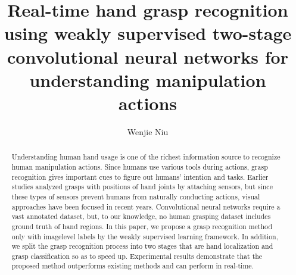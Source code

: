\documentclass[10pt,twocolumn,letterpaper]{article}
\begin{document}
\title{Real-time hand grasp recognition using weakly supervised two-stage convolutional neural networks for understanding manipulation actions}
\author{Wenjie Niu}
\maketitle

\begin{abstract}
   Understanding human hand usage is one of the richest information source to recognize human manipulation actions. Since humans use various tools during actions, grasp recognition gives important cues to figure out humans’ intention and tasks. Earlier studies analyzed grasps with positions of hand joints by attaching sensors, but since these types of sensors prevent humans from naturally conducting actions, visual approaches have been focused in recent years. Convolutional neural networks require a vast annotated dataset, but, to our knowledge, no human grasping dataset includes ground truth of hand regions. In this paper, we propose a grasp recognition method only with imagelevel labels by the weakly supervised learning framework. In addition, we split the grasp recognition process into two stages that are hand localization and grasp classification so as to speed up. Experimental results demonstrate that the proposed method outperforms existing methods and can perform in real-time.
\end{abstract}
\end{document}
